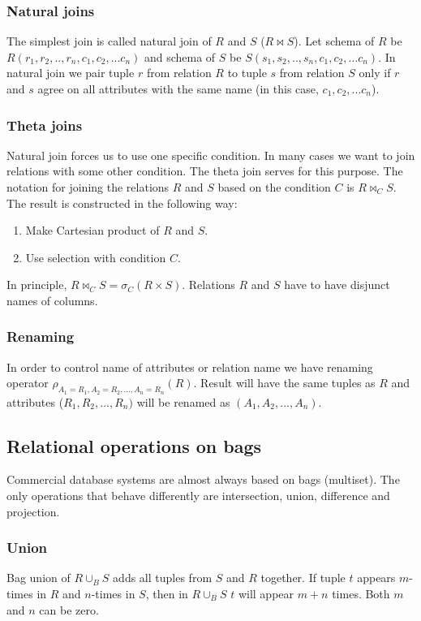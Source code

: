 \subsubsection{Natural joins}
The simplest join is called natural join of $R$ and $S$ ($R \Join S$). Let schema of $R$ be $R(r_1,r_2,..,r_n,c_1,c_2,...c_n)$ and schema of $S$ be  $S(s_1,s_2,..,s_n,c_1,c_2,...c_n)$. In natural join we pair tuple $r$ from relation $R$ to tuple $s$ from relation $S$ only if $r$ and $s$ agree on all attributes with the same name (in this case, $c_1,c_2,...c_n$).

\subsubsection{Theta joins}
Natural join forces us to use one specific condition. In many cases we want to join relations with some other condition. The theta join serves for this purpose. The notation for joining the relations $R$ and $S$ based on the condition $C$ is $R\Join_C S$. The result is constructed in the following way:

\begin{enumerate}
\item Make Cartesian product of $R$ and $S$.
\item Use selection with condition $C$.
\end{enumerate}

In principle, $R\Join_C S=\sigma_C(R \times S)$. Relations $R$ and $S$ have to have disjunct names of columns.

\subsubsection{Renaming}

In order to control name of attributes or relation name we have renaming operator $\rho_{A_1=R_1,A_2=R_2,...,A_n=R_n}(R)$. Result will have the same tuples as $R$ and attributes ($R_1,R_2,...,R_n)$ will be renamed as $(A_1,A_2,...,A_n)$.

\subsection{Relational operations on bags}

Commercial database systems are almost always based on bags (multiset). The only operations that behave differently are intersection, union, difference and projection.

\subsubsection{Union}
Bag union of $R \cup_B S$ adds all tuples from $S$ and $R$ together. If tuple $t$ appears $m$-times in $R$ and $n$-times in $S$, then in $R \cup_B S$ $t$ will appear $m+n$ times. Both $m$ and $n$ can be zero.

